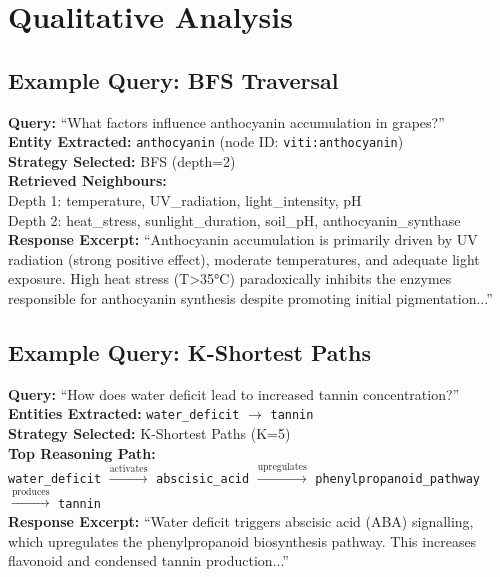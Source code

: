 \documentclass[12pt,a4paper]{article}
\begin{document}
\section{Qualitative Analysis}

\subsection{Example Query: BFS Traversal}

\begin{tcolorbox}[colback=lightbg, colframe=nodeblue, title=\textbf{Example: Exploratory Query}]
\textbf{Query:} ``What factors influence anthocyanin accumulation in grapes?''\\[4pt]
\textbf{Entity Extracted:} \texttt{anthocyanin} (node ID: \texttt{viti:anthocyanin})\\[4pt]
\textbf{Strategy Selected:} BFS (depth=2)\\[4pt]
\textbf{Retrieved Neighbours:}\\
\hspace{1cm}Depth 1: temperature, UV\_radiation, light\_intensity, pH\\
\hspace{1cm}Depth 2: heat\_stress, sunlight\_duration, soil\_pH, anthocyanin\_synthase\\[4pt]
\textbf{Response Excerpt:} ``Anthocyanin accumulation is primarily driven by
UV radiation (strong positive effect), moderate temperatures, and adequate
light exposure. High heat stress (T>35°C) paradoxically inhibits the
enzymes responsible for anthocyanin synthesis despite promoting initial
pigmentation...''
\end{tcolorbox}

\subsection{Example Query: K-Shortest Paths}

\begin{tcolorbox}[colback=accent!5, colframe=accent, title=\textbf{Example: Causal Chain Query}]
\textbf{Query:} ``How does water deficit lead to increased tannin concentration?''\\[4pt]
\textbf{Entities Extracted:} \texttt{water\_deficit} $\rightarrow$ \texttt{tannin}\\[4pt]
\textbf{Strategy Selected:} K-Shortest Paths (K=5)\\[4pt]
\textbf{Top Reasoning Path:}\\
\hspace{1cm}\texttt{water\_deficit} $\xrightarrow{\text{activates}}$
\texttt{abscisic\_acid} $\xrightarrow{\text{upregulates}}$
\texttt{phenylpropanoid\_pathway} $\xrightarrow{\text{produces}}$
\texttt{tannin}\\[4pt]
\textbf{Response Excerpt:} ``Water deficit triggers abscisic acid
(ABA) signalling, which upregulates the phenylpropanoid biosynthesis
pathway. This increases flavonoid and condensed tannin production...''
\end{tcolorbox}
\end{document}

